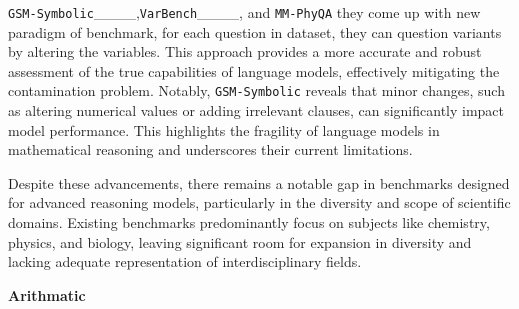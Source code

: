 {\texttt{GSM-Symbolic}____,\texttt{VarBench}____, and \texttt{MM-PhyQA} they come up with new paradigm of benchmark, for each question in dataset, they can question variants by altering the variables. This approach provides a more accurate and robust assessment of the true capabilities of language models, effectively mitigating the contamination problem. 
Notably, \texttt{GSM-Symbolic} reveals that minor changes, such as altering numerical values or adding irrelevant clauses, can significantly impact model performance. This highlights the fragility of language models in mathematical reasoning and underscores their current limitations.



Despite these advancements, there remains a notable gap in benchmarks designed for advanced reasoning models, particularly in the diversity and scope of scientific domains. Existing benchmarks predominantly focus on subjects like chemistry, physics, and biology, leaving significant room for expansion in diversity and lacking adequate representation of interdisciplinary fields. 



\textbf{Arithmatic}

}
